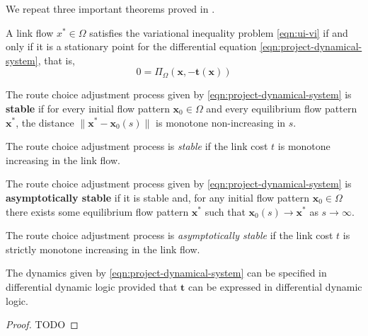 We repeat three important theorems proved in \citet{nagurney1997projected}.

\begin{theorem}
    \label{thm:correspondence}
    A link flow $x^*\in \Omega$ satisfies the variational inequality problem \eqref{eqn:ui-vi} if and only if it is a stationary point for the differential equation \eqref{eqn:project-dynamical-system}, that is,
    $$0= \Pi_{\Omega}(\mathbf{x}, -\mathbf{t}(\mathbf{x}))$$
\end{theorem}

\begin{definition}[Stability]
    \label{def:stability}
    The route choice adjustment process given by \eqref{eqn:project-dynamical-system} is \textbf{stable} if for every initial flow pattern $\mathbf{x}_0\in \Omega$ and every equilibrium flow pattern $\mathbf{x}^*$, the distance $\|\mathbf{x}^* - \mathbf{x}_0(s)\|$ is monotone non-increasing in $s$.
\end{definition}

\begin{theorem}
    The route choice adjustment process is \textit{stable} if the link cost $t$ is monotone increasing in the link flow.
\end{theorem}

\begin{definition}
     The route choice adjustment process given by \eqref{eqn:project-dynamical-system} is \textbf{asymptotically stable} if it is stable and, for any initial flow pattern $\mathbf{x}_0\in \Omega$ there exists some  equilibrium flow pattern $\mathbf{x}^*$ such that $\mathbf{x}_0(s) \to \mathbf{x}^*$ as $s\to \infty$.
\end{definition}

\begin{theorem}
    \label{thm:convergence}
    The route choice adjustment process is \textit{asymptotically stable} if the link cost $t$ is strictly monotone increasing in the link flow.
\end{theorem}

\begin{theorem}
The dynamics given by \eqref{eqn:project-dynamical-system} can be specified in differential dynamic logic provided that $\mathbf{t}$ can be expressed in differential dynamic logic.
\end{theorem}

\begin{proof}
    TODO
\end{proof}

